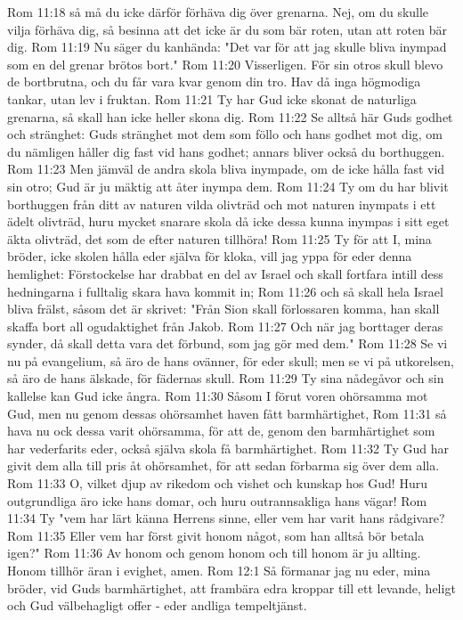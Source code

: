 Rom 11:18  så må du icke därför förhäva dig över grenarna. Nej, om du skulle vilja förhäva dig, så besinna att det icke är du som bär roten, utan att roten bär dig.
Rom 11:19  Nu säger du kanhända: "Det var för att jag skulle bliva inympad som en del grenar brötos bort."
Rom 11:20  Visserligen. För sin otros skull blevo de bortbrutna, och du får vara kvar genom din tro. Hav då inga högmodiga tankar, utan lev i fruktan.
Rom 11:21  Ty har Gud icke skonat de naturliga grenarna, så skall han icke heller skona dig.
Rom 11:22  Se alltså här Guds godhet och stränghet: Guds stränghet mot dem som föllo och hans godhet mot dig, om du nämligen håller dig fast vid hans godhet; annars bliver också du borthuggen.
Rom 11:23  Men jämväl de andra skola bliva inympade, om de icke hålla fast vid sin otro; Gud är ju mäktig att åter inympa dem.
Rom 11:24  Ty om du har blivit borthuggen från ditt av naturen vilda olivträd och mot naturen inympats i ett ädelt olivträd, huru mycket snarare skola då icke dessa kunna inympas i sitt eget äkta olivträd, det som de efter naturen tillhöra!
Rom 11:25  Ty för att I, mina bröder, icke skolen hålla eder själva för kloka, vill jag yppa för eder denna hemlighet: Förstockelse har drabbat en del av Israel och skall fortfara intill dess hedningarna i fulltalig skara hava kommit in;
Rom 11:26  och så skall hela Israel bliva frälst, såsom det är skrivet: "Från Sion skall förlossaren komma, han skall skaffa bort all ogudaktighet från Jakob.
Rom 11:27  Och när jag borttager deras synder, då skall detta vara det förbund, som jag gör med dem."
Rom 11:28  Se vi nu på evangelium, så äro de hans ovänner, för eder skull; men se vi på utkorelsen, så äro de hans älskade, för fädernas skull.
Rom 11:29  Ty sina nådegåvor och sin kallelse kan Gud icke ångra.
Rom 11:30  Såsom I förut voren ohörsamma mot Gud, men nu genom dessas ohörsamhet haven fått barmhärtighet,
Rom 11:31  så hava nu ock dessa varit ohörsamma, för att de, genom den barmhärtighet som har vederfarits eder, också själva skola få barmhärtighet.
Rom 11:32  Ty Gud har givit dem alla till pris åt ohörsamhet, för att sedan förbarma sig över dem alla.
Rom 11:33  O, vilket djup av rikedom och vishet och kunskap hos Gud! Huru outgrundliga äro icke hans domar, och huru outrannsakliga hans vägar!
Rom 11:34  Ty "vem har lärt känna Herrens sinne, eller vem har varit hans rådgivare?
Rom 11:35  Eller vem har först givit honom något, som han alltså bör betala igen?"
Rom 11:36  Av honom och genom honom och till honom är ju allting. Honom tillhör äran i evighet, amen.
Rom 12:1  Så förmanar jag nu eder, mina bröder, vid Guds barmhärtighet, att frambära edra kroppar till ett levande, heligt och Gud välbehagligt offer - eder andliga tempeltjänst.
